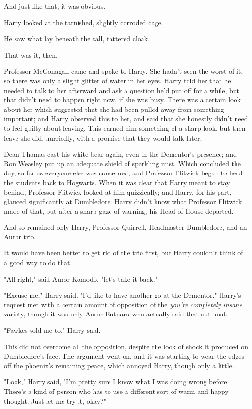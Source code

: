 And just like that, it was obvious.

Harry looked at the tarnished, slightly corroded cage.

He saw what lay beneath the tall, tattered cloak.

That was it, then.

Professor McGonagall came and spoke to Harry. She hadn't seen the worst of it,
so there was only a slight glitter of water in her eyes. Harry told her that he
needed to talk to her afterward and ask a question he'd put off for a while,
but that didn't need to happen right now, if she was busy. There was a certain
look about her which suggested that she had been pulled away from something
important; and Harry observed this to her, and said that she honestly didn't
need to feel guilty about leaving. This earned him something of a sharp look,
but then leave she did, hurriedly, with a promise that they would talk later.

Dean Thomas cast his white bear again, even in the Dementor's presence; and Ron
Weasley put up an adequate shield of sparkling mist. Which concluded the day,
so far as everyone else was concerned, and Professor Flitwick began to herd the
students back to Hogwarts. When it was clear that Harry meant to stay behind,
Professor Flitwick looked at him quizzically; and Harry, for his part, glanced
significantly at Dumbledore. Harry didn't know what Professor Flitwick made of
that, but after a sharp gaze of warning, his Head of House departed.

And so remained only Harry, Professor Quirrell, Headmaster Dumbledore, and an
Auror trio.

It would have been better to get rid of the trio first, but Harry couldn't
think of a good way to do that.

"All right," said Auror Komodo, "let's take it back."

"Excuse me," Harry said. "I'd like to have another go at the Dementor."
\sbreak
Harry's request met with a certain amount of opposition of the \emph{you're
completely insane} variety, though it was only Auror Butnaru who actually said
that out loud.

"Fawkes told me to," Harry said.

This did not overcome all the opposition, despite the look of shock it produced
on Dumbledore's face. The argument went on, and it was starting to wear the
edges off the phoenix's remaining peace, which annoyed Harry, though only a
little.

"Look," Harry said, "I'm pretty sure I know what I was doing wrong before.
There's a kind of person who has to use a different sort of warm and happy
thought. Just let me try it, okay?"

